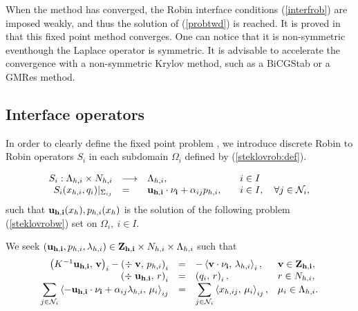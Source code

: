 \documentclass{article}
\newcommand{\bral}{\left<}
\newcommand{\brar}{\right>}
\newcommand{\Nui}[1]{{\mathcal N}_{#1}}
\newcommand{\dps}{\displaystyle}
\begin{document}
When the method has converged, the Robin interface conditions (\ref{interfrob})
are imposed weakly, and thus the solution of (\ref{probtwd}) is reached. It is
proved in \cite{vfcement-1999} that this fixed point method converges. One can
notice that it is non-symmetric eventhough the Laplace operator is symmetric.
It is advisable to accelerate the convergence with a non-symmetric Krylov
method, such as a BiCGStab or a GMRes method.

\subsection{Interface operators}

In order to clearly define the fixed point problem%
, we introduce
discrete Robin to Robin operators ${S}_i$ in each subdomain $\Omega_i$ defined
by (\ref{steklovrob:def}).

\begin{equation}\label{steklovrob:def}\begin{array}{rlll}
{S}_i : \Lambda_{h,i} \times N_{h,i} & \longrightarrow & \Lambda_{h,i}, &\quad i \in I \\
{S}_i(x_{h,i} , q_i )|_{\Sigma_{ij}}  & = & 
{\bf u_{h,i} \cdot  \nu_i} + \alpha_{ij} p_{h,i},  &\quad i \in I, 
\quad \forall j \in \Nui{i},
\end{array}\end{equation}
such that ${\bf u_{h,i}}(x_h), p_{h,i}(x_h)$ is the solution of the following problem
(\ref{steklovrobw}) set on $\Omega_i, \ i \in I$.

We seek $({\bf u_{h,i}}, p_{h,i}, \lambda_{h,i}) \in {\bf Z_{h,i}} \times
N_{h,i} \times \Lambda_{h,i}$ such that
\begin{equation}\label{steklovrobw}\begin{array}{rcll}
\left( K^{-1}{\bf u_{h,i}},\, {\bf v} \right)_{i} - 
\left( \div\; {\bf v}, \, p_{h,i} \right)_{i}  & = & \dps 
- \bral {\bf v \cdot  \nu_i} , \, \lambda_{h,i} \brar_{i}, 
& {\bf v} \in {\bf Z_{h,i}}, \\
\left( \div\; {\bf u_{h,i}}, \, r \right)_{i} &= &
 \left(q_i, \, r \right)_{i},  & r \in N_{h,i},\\
\dps \sum_{j \in \Nui{i}} \bral - {\bf u_{h,i} \cdot  \nu_i}  
+ \alpha_{ij} \lambda_{h,i}  , 
\, \mu_{i} \brar_{ij} & = & 
\dps \sum_{j \in \Nui{i}} \bral x_{h,ij}  , 
\, \mu_{i} \brar_{ij},  & \mu_{i} \in \Lambda_{h,i}.\\
\end{array}\end{equation}
\end{document}

